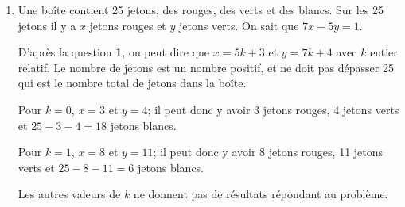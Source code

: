 \documentclass[12pt]{article}
\newcommand{\Z}{\mathbb{Z}}
\begin{document}
\begin{enumerate}
\begin{enumerate}


\end{enumerate}

\item
Une boîte contient 25 jetons, des rouges, des verts et des blancs. Sur les 25 jetons il y a $x$ jetons rouges et $y$ jetons verts. On sait que $7x-5y=1$.

D'après la question \textbf{1}, on peut dire que $x=5k+3$ et $y=7k+4$ avec $k$ entier relatif. Le nombre de jetons est un nombre positif, et ne doit pas dépasser 25 qui est le nombre total de jetons dans la boîte.

Pour $k=0$, $x=3$ et $y=4$; il peut donc y avoir 3 jetons rouges, 4 jetons verts et $25-3-4=18$ jetons blancs.

Pour $k=1$, $x=8$ et $y=11$; il peut donc y avoir 8 jetons rouges, 11 jetons verts et $25-8-11=6$ jetons blancs.

Les autres valeurs de $k$ ne donnent pas de résultats répondant au problème.
\end{enumerate}
\end{document}
